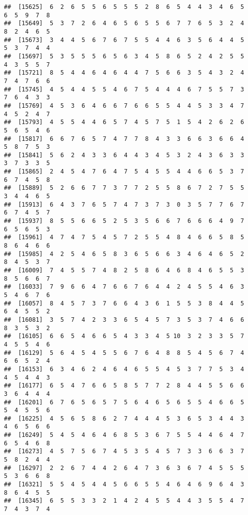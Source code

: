 \documentclass[
]{book}
\begin{document}
\begin{verbatim}
##  [15625]  6  2  6  5  5  6  5  5  5  2  8  6  5  4  4  3  4  6  5  6  5  9  7  8
##  [15649]  5  3  7  2  6  4  6  5  6  5  5  6  7  7  6  5  3  2  4  8  2  4  6  5
##  [15673]  3  4  4  5  6  7  6  7  5  5  4  4  6  3  5  6  4  4  5  5  3  7  4  4
##  [15697]  5  3  5  5  5  6  5  6  3  4  5  8  6  5  2  4  2  5  5  4  3  5  5  7
##  [15721]  8  5  4  4  6  4  6  4  4  7  5  6  6  3  5  4  3  2  4  7  4  7  6  6
##  [15745]  4  5  4  4  5  5  4  6  7  5  4  4  4  6  7  5  5  7  3  7  6  4  3  3
##  [15769]  4  5  3  6  4  6  6  7  6  6  5  5  4  4  5  3  3  4  7  4  5  2  4  7
##  [15793]  4  5  5  4  4  6  5  7  4  5  7  5  1  5  4  2  6  2  6  5  6  5  4  6
##  [15817]  6  6  7  6  5  7  4  7  7  8  4  3  3  6  6  3  6  6  4  5  8  7  5  3
##  [15841]  5  6  2  4  3  3  6  4  4  3  4  5  3  2  4  3  6  3  3  3  7  3  3  5
##  [15865]  2  4  5  4  7  6  4  7  5  4  5  5  4  4  6  6  5  3  7  6  7  4  5  8
##  [15889]  5  2  6  6  7  7  3  7  7  2  5  5  8  6  7  2  7  5  5  3  4  4  6  5
##  [15913]  6  4  3  7  6  5  7  4  7  3  7  3  0  3  5  7  7  6  7  6  7  4  5  7
##  [15937]  8  5  5  6  6  5  2  5  3  5  6  6  7  6  6  6  4  9  7  6  5  6  5  3
##  [15961]  4  7  4  7  5  4  5  7  2  5  5  4  8  4  6  6  5  8  5  8  6  4  6  6
##  [15985]  4  2  5  4  6  5  8  3  6  5  6  6  3  4  6  4  6  5  2  8  4  5  3  7
##  [16009]  7  4  5  5  7  4  8  2  5  8  6  4  6  8  4  6  5  5  3  8  5  6  6  7
##  [16033]  7  9  6  6  4  7  6  6  7  6  4  4  2  4  5  5  4  6  3  5  4  6  7  6
##  [16057]  8  4  5  7  3  7  6  6  4  3  6  1  5  5  3  8  4  4  5  6  4  5  5  2
##  [16081]  3  5  7  4  2  3  3  6  5  4  5  7  3  5  3  7  4  6  6  8  3  5  3  2
##  [16105]  6  6  5  4  6  6  5  4  3  3  4  5 10  3  2  3  3  5  7  4  5  5  4  6
##  [16129]  5  6  4  5  4  5  5  6  7  6  4  8  8  5  4  5  6  7  4  6  6  5  2  4
##  [16153]  6  3  4  6  2  4  6  4  6  5  5  4  5  3  7  7  5  3  4  4  5  4  4  3
##  [16177]  6  5  4  7  6  6  5  8  5  7  7  2  8  4  4  5  5  6  6  3  6  4  4  4
##  [16201]  6  7  6  5  6  5  7  5  6  4  6  5  6  5  5  4  6  6  5  5  4  5  5  6
##  [16225]  4  5  6  5  8  6  2  7  4  4  4  5  3  6  5  3  4  4  3  4  6  5  6  6
##  [16249]  5  4  5  4  6  4  6  8  5  3  6  7  5  5  4  4  6  4  7  6  5  4  6  8
##  [16273]  4  5  7  5  6  7  4  5  3  5  4  5  7  3  3  6  6  3  7  5  8  2  4  4
##  [16297]  2  2  6  7  4  4  2  6  4  7  3  6  3  6  7  4  5  5  5  5  3  6  6  8
##  [16321]  5  5  4  5  4  4  5  6  6  5  5  4  6  4  6  9  6  4  3  8  6  4  5  5
##  [16345]  6  5  5  3  3  2  1  4  2  4  5  5  4  4  3  5  5  4  7  7  4  3  7  4

\end{verbatim}
\end{document}
